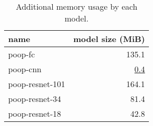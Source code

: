 \begin{table}[ht]
    \centering
    \caption[Model memory usage]{Additional memory usage by each model.}
    \label{tab:Results:Computation:Memory}
    \begin{tabular}{lr}
        \hline
        name & model size (MiB) \\
        \hline
        \acs{poop}-\acs{fc}         & 135.1 \\
        \acs{poop}-\acs{cnn}        &   \underline{0.4} \\
        \acs{poop}-\acs{resnet}-101 & 164.1 \\
        \acs{poop}-\acs{resnet}-34  &  81.4 \\
        \acs{poop}-\acs{resnet}-18  &  42.8 \\
    \end{tabular}
\end{table}

